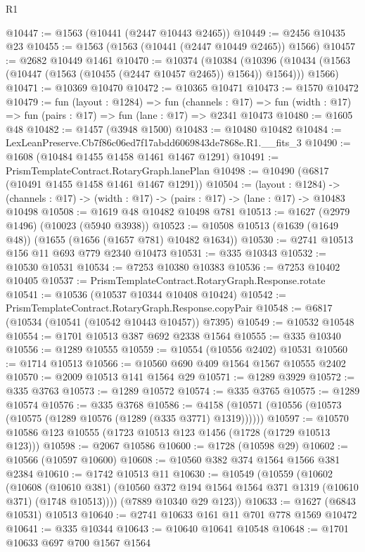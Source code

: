 \begin{lexlean}{R1}
\begin{coremodule}
@10447 := @1563 (@10441 (@2447 @10443 @2465))
@10449 := @2456 @10435 @23
@10455 := @1563 (@1563 (@10441 (@2447 @10449 @2465)) @1566)
@10457 := @2682 @10449 @1461
@10470 := @10374
    (@10384
      (@10396 (@10434 (@1563 (@10447 (@1563 (@10455 (@2447 @10457 @2465)) @1564)) @1564)))
      @1566)
@10471 := @10369 @10470
@10472 := @10365 @10471
@10473 := @1570 @10472
@10479 := fun (layout : @1284) =>
  fun (channels : @17) => fun (width : @17) => fun (pairs : @17) => fun (lane : @17) => @2341 @10473
@10480 := @1605 @48
@10482 := @1457 (@3948 @1500)
@10483 := @10480 @10482
@10484 := LexLeanPreserve.Cb7f86c06ed7f17abdd6069843de7868e.R1.__fits_3
@10490 := @1608 (@10484 @1455 @1458 @1461 @1467 @1291)
@10491 := PrismTemplateContract.RotaryGraph.lanePlan
@10498 := @10490 (@6817 (@10491 @1455 @1458 @1461 @1467 @1291))
@10504 := (layout : @1284) ->
  (channels : @17) -> (width : @17) -> (pairs : @17) -> (lane : @17) -> @10483 @10498
@10508 := @1619 @48 @10482 @10498 @781
@10513 := @1627 (@2979 @1496) (@10023 (@5940 @3938))
@10523 := @10508 @10513 (@1639 (@1649 @48)) (@1655 (@1656 (@1657 @781) @10482 @1634))
@10530 := @2741 @10513 @156 @11 @693 @779 @2340 @10473
@10531 := @335 @10343
@10532 := @10530 @10531
@10534 := @7253 @10380 @10383
@10536 := @7253 @10402 @10405
@10537 := PrismTemplateContract.RotaryGraph.Response.rotate
@10541 := @10536 (@10537 @10344 @10408 @10424)
@10542 := PrismTemplateContract.RotaryGraph.Response.copyPair
@10548 := @6817 (@10534 (@10541 (@10542 @10443 @10457)) @7395)
@10549 := @10532 @10548
@10554 := @1701 @10513 @387 @692 @2338 @1564
@10555 := @335 @10340
@10556 := @1289 @10555
@10559 := @10554 (@10556 @2402) @10531
@10560 := @1714 @10513
@10566 := @10560 @690 @409 @1564 @1567 @10555 @2402
@10570 := @2009 @10513 @141 @1564 @29
@10571 := @1289 @3929
@10572 := @335 @3763
@10573 := @1289 @10572
@10574 := @335 @3765
@10575 := @1289 @10574
@10576 := @335 @3768
@10586 := @4158 (@10571 (@10556 (@10573 (@10575 (@1289 @10576 (@1289 (@335 @3771) @1319))))))
@10597 := @10570 @10586 @123 @10555 (@1723 @10513 @123 @1456 (@1728 (@1729 @10513 @123)))
@10598 := @2067 @10586
@10600 := @1728 (@10598 @29)
@10602 := @10566 (@10597 @10600)
@10608 := @10560 @382 @374 @1564 @1566 @381 @2384
@10610 := @1742 @10513 @11
@10630 := @10549
    (@10559
      (@10602
        (@10608
          (@10610 @381)
          (@10560 @372 @194 @1564 @1564 @371 @1319 (@10610 @371) (@1748 @10513))))
      (@7889 @10340 @29 @123))
@10633 := @1627 (@6843 @10531) @10513
@10640 := @2741 @10633 @161 @11 @701 @778 @1569 @10472
@10641 := @335 @10344
@10643 := @10640 @10641 @10548
@10648 := @1701 @10633 @697 @700 @1567 @1564

\end{coremodule}
\end{lexlean}
